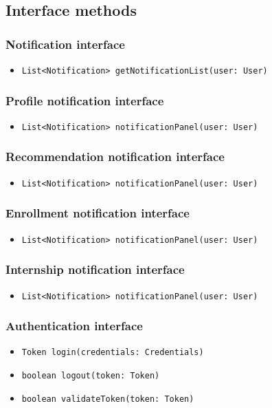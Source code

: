 \subsection{Interface methods}

\subsubsection{Notification interface}
\begin{itemize}
    \item \verb|List<Notification> getNotificationList(user: User)|
\end{itemize}

\subsubsection{Profile notification interface}
\begin{itemize}
    \item \verb|List<Notification> notificationPanel(user: User)|
\end{itemize}

\subsubsection{Recommendation notification interface}
\begin{itemize}
    \item \verb|List<Notification> notificationPanel(user: User)|
\end{itemize}

\subsubsection{Enrollment notification interface}
\begin{itemize}
    \item \verb|List<Notification> notificationPanel(user: User)|
\end{itemize}

\subsubsection{Internship notification interface}
\begin{itemize}
    \item \verb|List<Notification> notificationPanel(user: User)|
\end{itemize}

\subsubsection{Authentication interface}
\begin{itemize}
    \item \verb|Token login(credentials: Credentials)|
    \item \verb|boolean logout(token: Token)|
    \item \verb|boolean validateToken(token: Token)|
\end{itemize}

